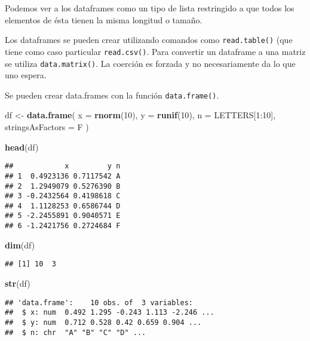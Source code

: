 \documentclass[]{article}
\newenvironment{Shaded}{\begin{snugshade}}{\end{snugshade}}
\newcommand{\KeywordTok}[1]{\textcolor[rgb]{0.13,0.29,0.53}{\textbf{{#1}}}}
\newcommand{\DataTypeTok}[1]{\textcolor[rgb]{0.13,0.29,0.53}{{#1}}}
\newcommand{\DecValTok}[1]{\textcolor[rgb]{0.00,0.00,0.81}{{#1}}}
\newcommand{\StringTok}[1]{\textcolor[rgb]{0.31,0.60,0.02}{{#1}}}
\newcommand{\NormalTok}[1]{{#1}}
\begin{document}
Podemos ver a los dataframes como un tipo de lista restringido a que
todos los elementos de ésta tienen la misma longitud o tamaño.

Los dataframes se pueden crear utilizando comandos como
\texttt{read.table()} (que tiene como caso particular
\texttt{read.csv()}. Para convertir un dataframe a una matriz se utiliza
\texttt{data.matrix()}. La coerción es forzada y no necesariamente da lo
que uno espera.

Se pueden crear data.frames con la función \texttt{data.frame()}.

\begin{Shaded}
\begin{Highlighting}[]
\NormalTok{df <-}\StringTok{ }\KeywordTok{data.frame}\NormalTok{(}
  \DataTypeTok{x =} \KeywordTok{rnorm}\NormalTok{(}\DecValTok{10}\NormalTok{),}
  \DataTypeTok{y =} \KeywordTok{runif}\NormalTok{(}\DecValTok{10}\NormalTok{),}
  \DataTypeTok{n =} \NormalTok{LETTERS[}\DecValTok{1}\NormalTok{:}\DecValTok{10}\NormalTok{],}
  \DataTypeTok{stringsAsFactors =} \NormalTok{F}
\NormalTok{)}

\KeywordTok{head}\NormalTok{(df)}
\end{Highlighting}
\end{Shaded}

\begin{verbatim}
##            x         y n
## 1  0.4923136 0.7117542 A
## 2  1.2949079 0.5276390 B
## 3 -0.2432564 0.4198618 C
## 4  1.1128253 0.6586744 D
## 5 -2.2455891 0.9040571 E
## 6 -1.2421756 0.2724684 F
\end{verbatim}

\begin{Shaded}
\begin{Highlighting}[]
\KeywordTok{dim}\NormalTok{(df)}
\end{Highlighting}
\end{Shaded}

\begin{verbatim}
## [1] 10  3
\end{verbatim}

\begin{Shaded}
\begin{Highlighting}[]
\KeywordTok{str}\NormalTok{(df)}
\end{Highlighting}
\end{Shaded}

\begin{verbatim}
## 'data.frame':    10 obs. of  3 variables:
##  $ x: num  0.492 1.295 -0.243 1.113 -2.246 ...
##  $ y: num  0.712 0.528 0.42 0.659 0.904 ...
##  $ n: chr  "A" "B" "C" "D" ...
\end{verbatim}
\end{document}
